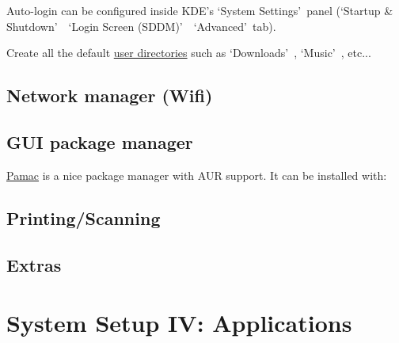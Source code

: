 Auto-login can be configured inside KDE's \lq System Settings\rq\ panel (\lq Startup \& Shutdown\rq\ \rightarrow\ \lq Login Screen (SDDM)\rq\ \rightarrow\ \lq Advanced\rq\ tab).

\begin{blocksection}
	Create all the default \href{https://wiki.archlinux.org/index.php/XDG_user_directories}{user directories} such as \lq Downloads\rq\ , \lq Music\rq\  , etc...
\end{blocksection}

\subsection{Network manager (Wifi)}

\subsection{GUI package manager}

\href{https://wiki.manjaro.org/index.php?title=Pamac}{Pamac} is a nice package manager with AUR support. It can be installed with:


\subsection{Printing/Scanning}


\subsection{Extras}


\section{System Setup IV: Applications}

